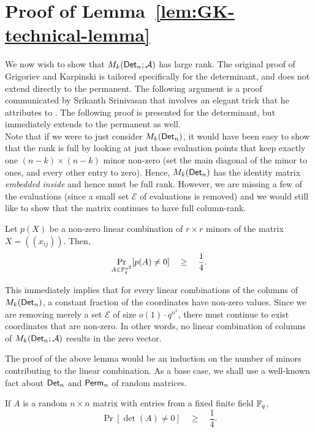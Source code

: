 \section{Proof of Lemma~\ref{lem:GK-technical-lemma} {} }

We now wish to show that $M_k(\mathsf{Det}_n;\mathcal{A})$ has large rank. The
original proof of Grigoriev and Karpinski is tailored specifically for
the determinant, and does not extend directly to the permanent. The
following argument is a proof communicated by Srikanth Srinivasan
\cite{Srikanth13} that involves an elegant trick that he attributes to
\cite{Koutis08}. The following proof is presented for the determinant,
but immediately extends to the permanent as well. \\


Note that if we were to just consider $M_k(\mathsf{Det}_n)$, it would have
been easy to show that the rank is full by looking at just those
evaluation points that keep exactly one $(n-k)\times (n-k)$ minor
non-zero (set the main diagonal of the minor to ones, and every other
entry to zero). Hence, $M_k(\mathsf{Det}_n)$ has the identity matrix
\emph{embedded inside} and hence must be full rank. However, we are
missing a few of the evaluations (since a small set $\mathcal{E}$ of
evaluations is removed) and we would still like to show that the
matrix continues to have full column-rank.

\begin{lemma}\label{lem:random-lc-det-nonzero}
  Let $p(X)$ be a non-zero linear combination of $r\times r$
  minors of the matrix $X = (\!(x_{ij})\!)$. Then, 
  $$
  \Pr_{A\in \mathbb{F}_q^{n^2}}[p(A) \neq 0] \quad \geq \quad \frac{1}{4}.
  $$
\end{lemma}

This immediately implies that for every linear combinations of the
columns of $M_k(\mathsf{Det}_n)$, a constant fraction of the coordinates have
non-zero values. Since we are removing merely a set $\mathcal{E}$ of
size $o(1) \cdot q^{n^2}$, there must continue to exist coordinates that
are non-zero. In other words, no linear combination of columns of
$M_k(\mathsf{Det}_n;\mathcal{A})$ results in the zero vector.


The proof of the above lemma would be an induction on the number of
minors contributing to the linear combination. As a base case, we
shall use a well-known fact about $\mathsf{Det}_n$ and $\mathsf{Perm}_n$ of random
matrices.

\begin{proposition}\label{prop:random-det-nonzero}
  If $A$ is a random $n\times n$ matrix with entries from a fixed
  finite field $\mathbb{F}_q$, 
$$
\Pr[\det(A) \neq 0] \quad\geq\quad \frac{1}{4}.
$$
\end{proposition}

